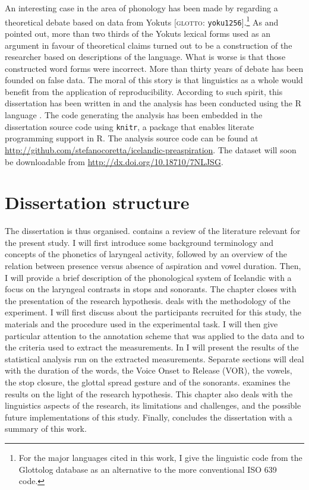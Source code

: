 \documentclass[11pt,a4paper,oneside,openany]{memoir}\usepackage[]{graphicx}\usepackage[]{color}
\begin{document}
An interesting case in the area of phonology has been made by \citet{maxwell2013} regarding a theoretical debate based on data from Yokuts [\textsc{glotto}: \texttt{yoku1256}].\footnote{For the major languages cited in this work, I give the linguistic code from the Glottolog database \citep{hammarstrom2016} as an alternative to the more conventional ISO 639 code.}
As \citet{weigel2002} and \citet{blevins2004a} pointed out, more than two thirds of the Yokuts lexical forms used as an argument in favour of theoretical claims turned out to be a construction of the researcher based on descriptions of the language.
What is worse is that those constructed word forms were incorrect.
More than thirty years of debate has been founded on false data.
The moral of this story is that linguistics as a whole would benefit from the application of reproducibility.
According to such spirit, this dissertation has been written in \XeLaTeX{} and the analysis has been conducted using the R language \citep{r-core-team2015}. 
The code generating the analysis has been embedded in the dissertation source code using \texttt{knitr}, a package that enables literate programming support in R.
The analysis source code can be found at \url{http://github.com/stefanocoretta/icelandic-preaspiration}.
The dataset will soon be downloadable from \url{http://dx.doi.org/10.18710/7NLJSG}.

\section{Dissertation structure}
The dissertation is thus organised.
 contains a review of the literature relevant for the present study.
I will first introduce some background terminology and concepts of the phonetics of laryngeal activity, followed by an overview of the relation between presence versus absence of aspiration and vowel duration.
Then, I will provide a brief description of the phonological system of Icelandic with a focus on the laryngeal contrasts in stops and sonorants.
The chapter closes with the presentation of the research hypothesis.
 deals with the methodology of the experiment.
I will first discuss about the participants recruited for this study, the materials and the procedure used in the experimental task.
I will then give particular attention to the annotation scheme that was applied to the data and to the criteria used to extract the measurements.
In  I will present the results of the statistical analysis run on the extracted measurements.
Separate sections will deal with the duration of the words, the Voice Onset to Release (VOR), the vowels, the stop closure, the glottal spread gesture and of the sonorants.
 examines the results on the light of the research hypothesis.
This chapter also deals with the linguistics aspects of the research, its limitations and challenges, and the possible future implementations of this study.
Finally,  concludes the dissertation with a summary of this work.
\end{document}
